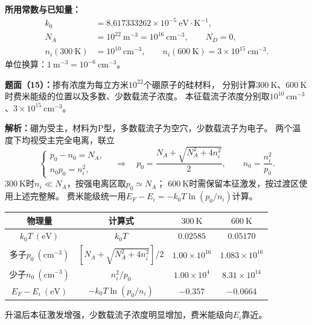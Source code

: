 \begin{problem}
    \textbf{所用常数与已知量：}
    \[
    \begin{aligned}
        k_0&=8.617333262\times10^{-5}\ \mathrm{eV\cdot K^{-1}},\\
        N_A&=10^{22}\ \mathrm{m}^{-3}=10^{16}\ \mathrm{cm}^{-3},
        \qquad N_D=0,\\
        n_i(300\ \mathrm{K})&=10^{10}\ \mathrm{cm}^{-3},
        \qquad n_i(600\ \mathrm{K})=3\times10^{15}\ \mathrm{cm}^{-3}.
    \end{aligned}
    \]
    单位换算：$1\ \mathrm{m}^{-3}=10^{-6}\ \mathrm{cm}^{-3}$。

    \textbf{题面（15）：}掺有浓度为每立方米$10^{22}$个硼原子的硅材料，
    分别计算$300\ \mathrm{K}$、$600\ \mathrm{K}$时费米能级的位置以及多数、少数载流子浓度。
    本征载流子浓度分别取$10^{10}\ \mathrm{cm}^{-3}$、$3\times10^{15}\ \mathrm{cm}^{-3}$。

    \textbf{解析：}硼为受主，材料为P型，多数载流子为空穴，少数载流子为电子。
    两个温度下均视受主完全电离，联立
    \[
    \begin{cases}
        p_0-n_0=N_A,\\
        n_0p_0=n_i^2,
    \end{cases}
    \quad\Longrightarrow\quad
    p_0=\frac{N_A+\sqrt{N_A^2+4n_i^2}}{2},\qquad
    n_0=\frac{n_i^2}{p_0}.
    \]
    $300\ \mathrm{K}$时$n_i\ll N_A$，按强电离区取$p_0\simeq N_A$；
    $600\ \mathrm{K}$时需保留本征激发，按过渡区使用上述完整解。
    费米能级统一用$E_F-E_i=-k_0T\ln(p_0/n_i)$计算。
    \begin{center}
        \small
        \begin{tabular}{c c c c}
            \hline
            物理量 & 计算式 & $300\ \mathrm{K}$ & $600\ \mathrm{K}$ \\
            \hline
            $k_0T\ (\mathrm{eV})$ & $k_0T$ & $0.02585$ & $0.05170$ \\
            多子$p_0\ (\mathrm{cm}^{-3})$ & $[N_A+\sqrt{N_A^2+4n_i^2}]/2$ & $\boxed{1.00\times10^{16}}$ & $\boxed{1.083\times10^{16}}$ \\
            少子$n_0\ (\mathrm{cm}^{-3})$ & $n_i^2/p_0$ & $\boxed{1.00\times10^4}$ & $\boxed{8.31\times10^{14}}$ \\
            $E_F-E_i\ (\mathrm{eV})$ & $-k_0T\ln(p_0/n_i)$ & $\boxed{-0.357}$ & $\boxed{-0.0664}$ \\
            \hline
        \end{tabular}
    \end{center}
    升温后本征激发增强，少数载流子浓度明显增加，费米能级向$E_i$靠近。
\end{problem}

